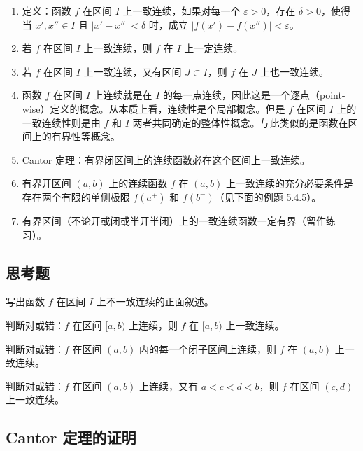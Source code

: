\begin{enumerate}
  \item 定义：函数 $f$ 在区间 $I$ 上一致连续，如果对每一个 $\varepsilon>0$，存在 $\delta>0$，使得当 $x',x''\in I$ 且 $|x'-x''|<\delta$ 时，成立 $|f(x')-f(x'')|<\varepsilon$。
  \item 若 $f$ 在区间 $I$ 上一致连续，则 $f$ 在 $I$ 上一定连续。
  \item 若 $f$ 在区间 $I$ 上一致连续，又有区间 $J\subset I$，则 $f$ 在 $J$ 上也一致连续。
  \item 函数 $f$ 在区间 $I$ 上连续就是在 $I$ 的每一点连续，因此这是一个逐点（point-wise）定义的概念。从本质上看，连续性是个局部概念。但是 $f$ 在区间 $I$ 上的一致连续性则是由 $f$ 和 $I$ 两者共同确定的整体性概念。与此类似的是函数在区间上的有界性等概念。
  \item Cantor 定理：有界闭区间上的连续函数必在这个区间上一致连续。
  \item 有界开区间 $(a,b)$ 上的连续函数 $f$ 在 $(a,b)$ 上一致连续的充分必要条件是存在两个有限的单侧极限 $f(a^+)$ 和 $f(b^-)$（见下面的例题 5.4.5）。
  \item 有界区间（不论开或闭或半开半闭）上的一致连续函数一定有界（留作练习）。
\end{enumerate}

\subsection{思考题}

\begin{xthought}[1]
写出函数 $f$ 在区间 $I$ 上不一致连续的正面叙述。
\end{xthought}

\begin{xthought}[2]
判断对或错：$f$ 在区间 $[a,b)$ 上连续，则 $f$ 在 $[a,b)$ 上一致连续。
\end{xthought}

\begin{xthought}[3]
判断对或错：$f$ 在区间 $(a,b)$ 内的每一个闭子区间上连续，则 $f$ 在 $(a,b)$ 上一致连续。
\end{xthought}

\begin{xthought}[4]
判断对或错：$f$ 在区间 $(a,b)$ 上连续，又有 $a<c<d<b$，则 $f$ 在区间 $(c,d)$ 上一致连续。
\end{xthought}

\subsection{Cantor 定理的证明}

